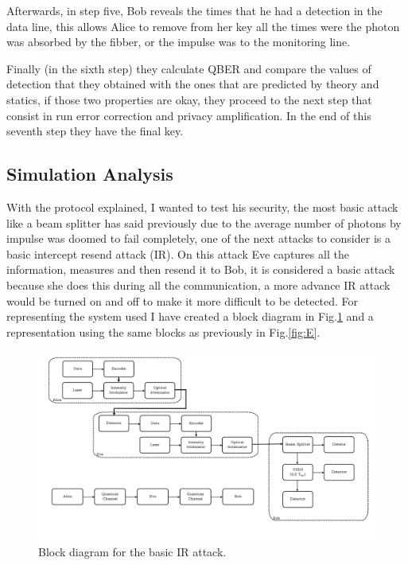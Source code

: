 \begin{refsection}
Afterwards, in step five, Bob reveals the times that he had a detection in the data line, this allows Alice to remove from her key all the times were the photon was absorbed by the fibber, or the impulse was to the monitoring line.

Finally (in the sixth step) they calculate QBER and compare the values of detection that they obtained with the ones that are predicted by theory and statics, if those two properties are okay, they proceed to the next step that consist in run error correction and privacy amplification. In the end of this seventh step they have the final key.

\subsection{Simulation Analysis}

With the protocol explained, I wanted to test his security, the most basic attack like a beam splitter has said previously due to the average number of photons by impulse was doomed to fail completely, one of the next attacks to consider is a basic intercept resend attack (IR). On this attack Eve captures all the information, measures and then resend it to Bob, it is considered a basic attack because she does this during all the communication, a more advance IR attack would be turned on and off to make it more difficult to be detected. For representing the system used I have created a block diagram in Fig.\ref{fig:bloc} and a representation using the same blocks as previously in Fig.\ref{fig:E}.

\begin{figure}[h]
\centering
\includegraphics[width=1\linewidth]{./sdf/tq_76558_cow_protocol/slides/figures/Diagrama_de_blocos.pdf}
\caption{Block diagram for the basic IR attack.}
\label{fig:bloc}
\end{figure}


\end{refsection}
